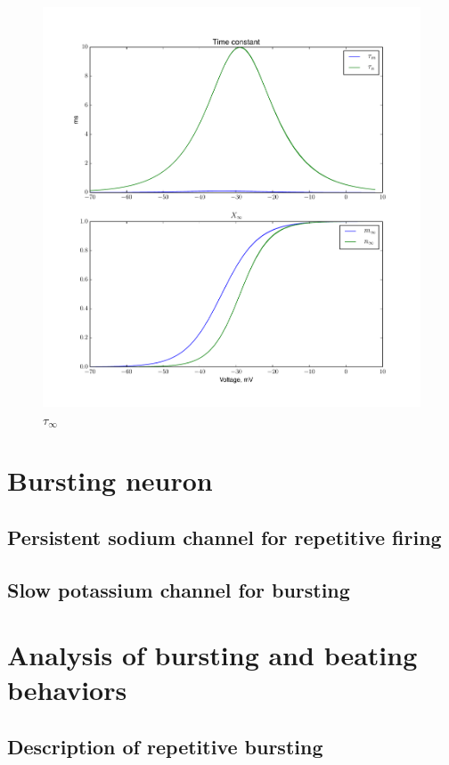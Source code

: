 \documentclass[a4paper,11pt]{article} %
\begin{document}
\begin{figure}[H]
    \centering
    \includegraphics[width=\textwidth]{tau_inf}
    \caption{$\tau_\infty$}
    \label{fig:tau_inf}
\end{figure}

\section{Bursting neuron}
\subsection{Persistent sodium channel for repetitive firing}
\subsection{Slow potassium channel for bursting}
\section{Analysis of bursting and beating behaviors}
\subsection{Description of repetitive bursting}
\end{document}
